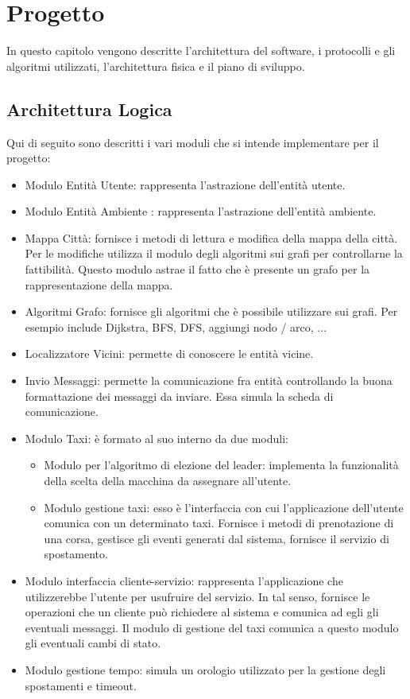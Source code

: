 
\chapter{Progetto} \label{progetto}

In questo capitolo vengono descritte l'architettura del software, i protocolli e gli algoritmi utilizzati, l'architettura fisica e il piano di sviluppo.

\section{Architettura Logica}

Qui di seguito sono descritti i vari moduli che si intende implementare per il progetto:

\begin{itemize} \label{modules}
	\item Modulo Entità Utente: rappresenta l'astrazione dell'entità utente.
	\item Modulo Entità Ambiente : rappresenta l'astrazione dell'entità ambiente.
	\item Mappa Città: fornisce i metodi di lettura e modifica della mappa della città. Per le modifiche utilizza il modulo degli algoritmi sui grafi per controllarne la fattibilità. Questo modulo astrae il fatto che è presente un grafo per la rappresentazione della mappa.
	\item Algoritmi Grafo: fornisce gli algoritmi che è possibile utilizzare sui grafi. Per esempio include Dijkstra, BFS, DFS, aggiungi nodo / arco, ...
	\item Localizzatore Vicini: permette di conoscere le entità vicine.
	\item Invio Messaggi: permette la comunicazione fra entità controllando la buona formattazione dei messaggi da inviare. Essa simula la scheda di comunicazione.
	\item Modulo Taxi: è formato al suo interno da due moduli:
	\begin{itemize}
		\item Modulo per l'algoritmo di elezione del leader: implementa la funzionalità della scelta della macchina da assegnare all'utente.
		\item Modulo gestione taxi: esso è l'interfaccia con cui l'applicazione dell'utente comunica con un determinato taxi. Fornisce i metodi di prenotazione di una corsa, gestisce gli eventi generati dal sistema, fornisce il servizio di spostamento.
	\end{itemize}
	\item Modulo interfaccia cliente-servizio: rappresenta l'applicazione che utilizzerebbe l'utente per usufruire del servizio. In tal senso, fornisce le operazioni che un cliente può richiedere al sistema e comunica ad egli gli eventuali messaggi. Il modulo di gestione del taxi comunica a questo modulo gli eventuali cambi di stato.
	\item Modulo gestione tempo: simula un orologio utilizzato per la gestione degli spostamenti e timeout.
\end{itemize}

